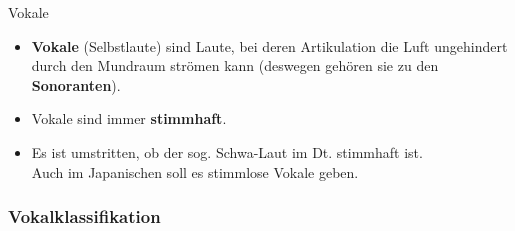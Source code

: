\begin{frame}{Vokale}

	\begin{itemize}
		\item \textbf{Vokale} (Selbstlaute) sind Laute, bei deren Artikulation die Luft ungehindert durch den Mundraum strömen kann (deswegen gehören sie zu den \textbf{Sonoranten}).
		
		\item Vokale sind \idR immer \textbf{stimmhaft}.
		
		\item Es ist umstritten, ob der sog. Schwa-Laut im Dt. \textipa{[ @ ]} stimmhaft
                  ist.\\
                  Auch im Japanischen soll es stimmlose Vokale geben.
	\end{itemize}
	
\end{frame}


\subsubsection{Vokalklassifikation}

